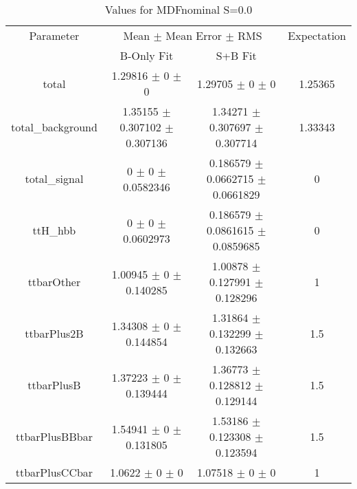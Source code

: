 \begin{table}
\centering
\caption{Values for MDFnominal S=0.0}
\begin{tabular}{cccc}
\toprule
Parameter & \multicolumn{2}{c}{Mean $\pm$ Mean Error $\pm$ RMS} & Expectation\\
 & B-Only Fit & S+B Fit & \\
\midrule
total & \num{1.29816} $\pm$ \num{0} $\pm$ \num{0} & \num{1.29705} $\pm$ \num{0} $\pm$ \num{0} & \num{1.25365}\\
total\_background & \num{1.35155} $\pm$ \num{0.307102} $\pm$ \num{0.307136} & \num{1.34271} $\pm$ \num{0.307697} $\pm$ \num{0.307714} & \num{1.33343}\\
total\_signal & \num{0} $\pm$ \num{0} $\pm$ \num{0.0582346} & \num{0.186579} $\pm$ \num{0.0662715} $\pm$ \num{0.0661829} & \num{0}\\
ttH\_hbb & \num{0} $\pm$ \num{0} $\pm$ \num{0.0602973} & \num{0.186579} $\pm$ \num{0.0861615} $\pm$ \num{0.0859685} & \num{0}\\
ttbarOther & \num{1.00945} $\pm$ \num{0} $\pm$ \num{0.140285} & \num{1.00878} $\pm$ \num{0.127991} $\pm$ \num{0.128296} & \num{1}\\
ttbarPlus2B & \num{1.34308} $\pm$ \num{0} $\pm$ \num{0.144854} & \num{1.31864} $\pm$ \num{0.132299} $\pm$ \num{0.132663} & \num{1.5}\\
ttbarPlusB & \num{1.37223} $\pm$ \num{0} $\pm$ \num{0.139444} & \num{1.36773} $\pm$ \num{0.128812} $\pm$ \num{0.129144} & \num{1.5}\\
ttbarPlusBBbar & \num{1.54941} $\pm$ \num{0} $\pm$ \num{0.131805} & \num{1.53186} $\pm$ \num{0.123308} $\pm$ \num{0.123594} & \num{1.5}\\
ttbarPlusCCbar & \num{1.0622} $\pm$ \num{0} $\pm$ \num{0} & \num{1.07518} $\pm$ \num{0} $\pm$ \num{0} & \num{1}\\
\bottomrule
\end{tabular}
\end{table}